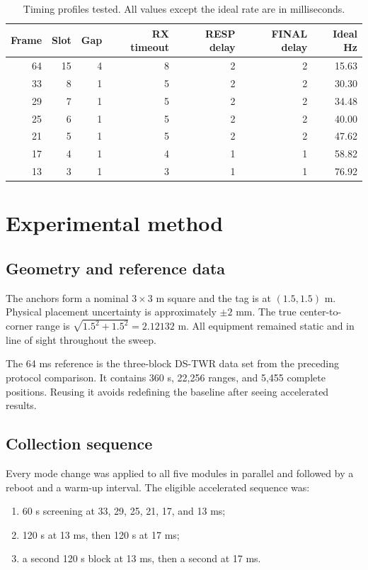 \documentclass[11pt,a4paper]{article}
\begin{document}
\begin{table}[H]
  \centering
  \caption{Timing profiles tested. All values except the ideal rate are in
  milliseconds.}
  \small
  \begin{tabular}{rrrrrrr}
    \toprule
    Frame & Slot & Gap & RX timeout & RESP delay & FINAL delay & Ideal Hz\\
    \midrule
    64 & 15 & 4 & 8 & 2 & 2 & 15.63\\
    33 & 8 & 1 & 5 & 2 & 2 & 30.30\\
    29 & 7 & 1 & 5 & 2 & 2 & 34.48\\
    25 & 6 & 1 & 5 & 2 & 2 & 40.00\\
    21 & 5 & 1 & 5 & 2 & 2 & 47.62\\
    17 & 4 & 1 & 4 & 1 & 1 & 58.82\\
    13 & 3 & 1 & 3 & 1 & 1 & 76.92\\
    \bottomrule
  \end{tabular}
\end{table}

\section{Experimental method}

\subsection{Geometry and reference data}

The anchors form a nominal $3\times3$ m square and the tag is at
$(1.5,1.5)$ m. Physical placement uncertainty is approximately
$\pm2$ mm. The true center-to-corner range is
$\sqrt{1.5^2+1.5^2}=2.12132$ m. All equipment remained static and in line of
sight throughout the sweep.

The 64 ms reference is the three-block DS-TWR data set from the preceding
protocol comparison. It contains 360 s, 22,256 ranges, and 5,455 complete
positions. Reusing it avoids redefining the baseline after seeing accelerated
results.

\subsection{Collection sequence}

Every mode change was applied to all five modules in parallel and followed by
a reboot and a warm-up interval. The eligible accelerated sequence was:

\begin{enumerate}[leftmargin=8mm]
  \item 60 s screening at 33, 29, 25, 21, 17, and 13 ms;
  \item 120 s at 13 ms, then 120 s at 17 ms;
  \item a second 120 s block at 13 ms, then a second at 17 ms.
\end{enumerate}
\end{document}
